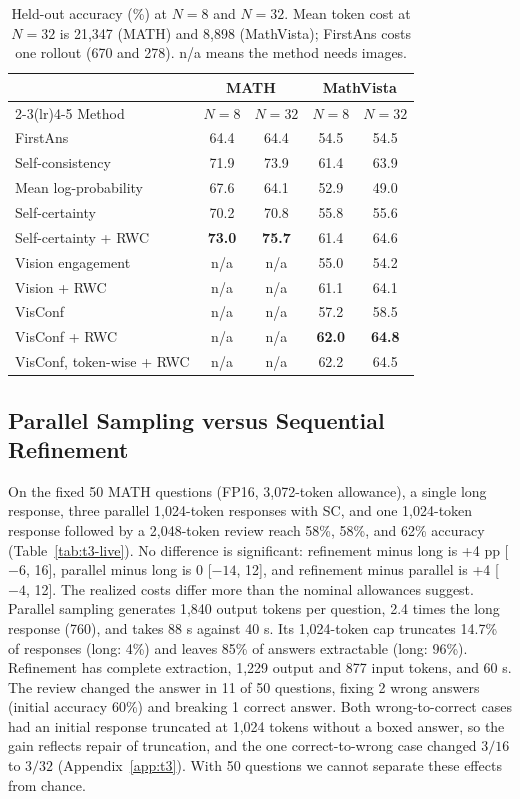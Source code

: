\documentclass{article}
\begin{document}
\begin{table}[t]
\centering
\caption{Held-out accuracy (\%) at $N=8$ and $N=32$. Mean token cost at $N=32$ is 21,347 (MATH) and 8,898 (MathVista); FirstAns costs one rollout (670 and 278). n/a means the method needs images.}
\label{tab:t3-methods}
\footnotesize
\begin{tabular}{lcccc}
\toprule
 & \multicolumn{2}{c}{MATH} & \multicolumn{2}{c}{MathVista} \\
\cmidrule(lr){2-3}\cmidrule(lr){4-5}
Method & $N=8$ & $N=32$ & $N=8$ & $N=32$ \\
\midrule
FirstAns & 64.4 & 64.4 & 54.5 & 54.5 \\
Self-consistency & 71.9 & 73.9 & 61.4 & 63.9 \\
Mean log-probability & 67.6 & 64.1 & 52.9 & 49.0 \\
Self-certainty & 70.2 & 70.8 & 55.8 & 55.6 \\
Self-certainty + RWC & \textbf{73.0} & \textbf{75.7} & 61.4 & 64.6 \\
Vision engagement & n/a & n/a & 55.0 & 54.2 \\
Vision + RWC & n/a & n/a & 61.1 & 64.1 \\
VisConf & n/a & n/a & 57.2 & 58.5 \\
VisConf + RWC & n/a & n/a & \textbf{62.0} & \textbf{64.8} \\
VisConf, token-wise + RWC & n/a & n/a & 62.2 & 64.5 \\
\bottomrule
\end{tabular}
\end{table}

\subsection{Parallel Sampling versus Sequential Refinement}
On the fixed 50 MATH questions (FP16, 3,072-token allowance), a single long response, three parallel 1,024-token responses with SC, and one 1,024-token response followed by a 2,048-token review \citep{madaan2023selfrefine} reach 58\%, 58\%, and 62\% accuracy (Table~\ref{tab:t3-live}). No difference is significant: refinement minus long is +4 pp [$-6$, 16], parallel minus long is 0 [$-14$, 12], and refinement minus parallel is +4 [$-4$, 12]. The realized costs differ more than the nominal allowances suggest. Parallel sampling generates 1,840 output tokens per question, 2.4 times the long response (760), and takes 88 s against 40 s. Its 1,024-token cap truncates 14.7\% of responses (long: 4\%) and leaves 85\% of answers extractable (long: 96\%). Refinement has complete extraction, 1,229 output and 877 input tokens, and 60 s. The review changed the answer in 11 of 50 questions, fixing 2 wrong answers (initial accuracy 60\%) and breaking 1 correct answer. Both wrong-to-correct cases had an initial response truncated at 1,024 tokens without a boxed answer, so the gain reflects repair of truncation, and the one correct-to-wrong case changed $3/16$ to $3/32$ (Appendix~\ref{app:t3}). With 50 questions we cannot separate these effects from chance.
\end{document}
